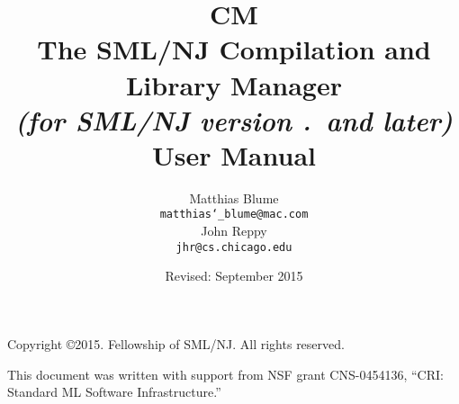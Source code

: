 \documentclass[titlepage,letterpaper]{article}
\author{
  Matthias Blume \\
  \texttt{matthias\char`\_blume@mac.com}\\[0.5em]
  John Reppy\\
  \texttt{jhr@cs.chicago.edu}}
\date{Revised: September 2015}
\title{
  \textbf{CM}\\
  The SML/NJ Compilation and Library Manager \\
  \textit{\small (for SML/NJ version \smlmj.\smlmn~and later)} \\
  User Manual
}
\begin{document}



\maketitle

\phantom{.}
\thispagestyle{empty}
	
\noindent Copyright \copyright{}2015.  Fellowship of SML/NJ.  All rights reserved.
	
\vskip 12pt
\noindent This document was written with support from NSF grant CNS-0454136,
``CRI: Standard ML Software Infrastructure.''
	
\pagebreak

\tableofcontents

\pagebreak



















\pagebreak



\pagebreak

\appendix









\end{document}
